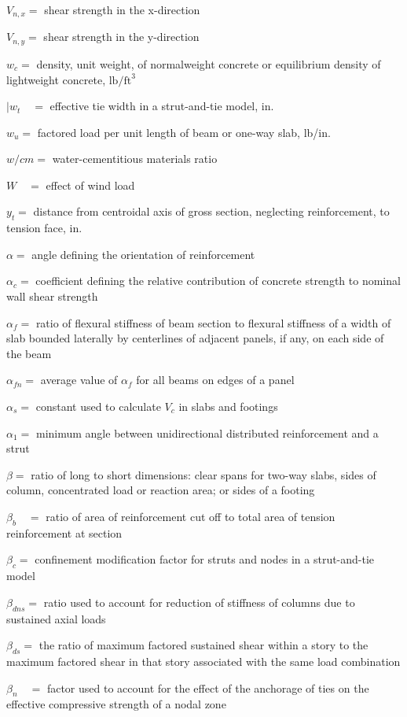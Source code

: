 \documentclass[10pt]{article}
\begin{document}
$V_{n, x}=$ shear strength in the x-direction

$V_{n, y}=$ shear strength in the y-direction

$w_{c}=$ density, unit weight, of normalweight concrete or equilibrium density of lightweight concrete, $\mathrm{lb} / \mathrm{ft}^{3}$

$\mid w_{t} \quad=$ effective tie width in a strut-and-tie model, in.

$w_{u}=$ factored load per unit length of beam or one-way slab, lb/in.

$w / c m=$ water-cementitious materials ratio

$W \quad=$ effect of wind load

$y_{t}=$ distance from centroidal axis of gross section, neglecting reinforcement, to tension face, in.

$\alpha=$ angle defining the orientation of reinforcement

$\alpha_{c}=$ coefficient defining the relative contribution of concrete strength to nominal wall shear strength

$\alpha_{f}=$ ratio of flexural stiffness of beam section to flexural stiffness of a width of slab bounded laterally by centerlines of adjacent panels, if any, on each side of the beam

$\alpha_{f n}=$ average value of $\alpha_{f}$ for all beams on edges of a panel

$\alpha_{s}=$ constant used to calculate $V_{c}$ in slabs and footings

$\alpha_{1}=$ minimum angle between unidirectional distributed reinforcement and a strut

$\beta=$ ratio of long to short dimensions: clear spans for two-way slabs, sides of column, concentrated load or reaction area; or sides of a footing

$\beta_{b} \quad=$ ratio of area of reinforcement cut off to total area of tension reinforcement at section

$\beta_{c}=$ confinement modification factor for struts and nodes in a strut-and-tie model

$\beta_{d n s}=$ ratio used to account for reduction of stiffness of columns due to sustained axial loads

$\beta_{d s}=$ the ratio of maximum factored sustained shear within a story to the maximum factored shear in that story associated with the same load combination

$\beta_{n} \quad=$ factor used to account for the effect of the anchorage of ties on the effective compressive strength of a nodal zone
\end{document}
